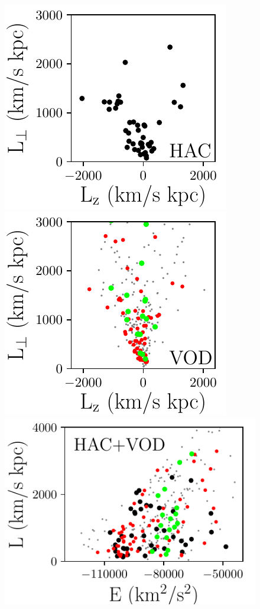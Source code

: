 \documentclass[fleqn,usenatbib]{mnras}
\begin{document}
%
   \begin{figure}
	        \includegraphics[scale=0.4035]{HAC_Lz_Lp.pdf}
	    \includegraphics[scale=0.4035]{VOD_Lz_Lp.pdf}
        \includegraphics[scale=0.4035]{E_L.pdf}

\end{figure}
\end{document}

